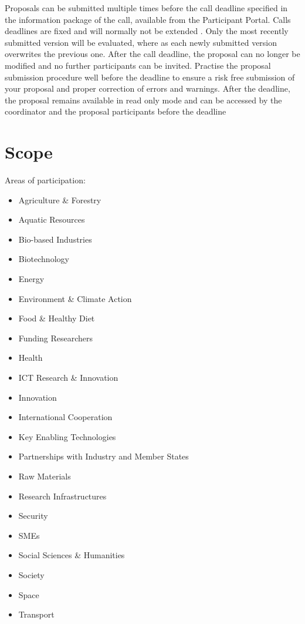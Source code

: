 \documentclass{article}
\begin{document}
Proposals can be submitted multiple times before the call deadline specified in the information package of the call, available from the Participant Portal. Calls deadlines are fixed and will normally not be extended . Only the most recently submitted version will be evaluated, where as each newly submitted version overwrites the previous one. After the call deadline, the proposal can no longer be modified and no further participants can be invited. Practise the proposal submission procedure well before the deadline to ensure a risk free submission of your proposal and proper correction of errors and warnings. After the deadline, the proposal remains available in read only mode and can be accessed by the coordinator and the proposal participants before the deadline

\section{Scope}
Areas of participation:
\begin{itemize}
	\item Agriculture \& Forestry
	\item Aquatic Resources
	\item Bio-based Industries
    \item Biotechnology
    \item Energy
    \item Environment \& Climate Action
    \item Food \& Healthy Diet
    \item Funding Researchers
    \item Health
    \item ICT Research \& Innovation
    \item Innovation
    \item International Cooperation
    \item Key Enabling Technologies
    \item Partnerships with Industry and Member States
    \item Raw Materials
    \item Research Infrastructures
    \item Security
    \item SMEs
    \item Social Sciences \& Humanities
    \item Society
    \item Space
    \item Transport
\end{itemize}
\end{document}
